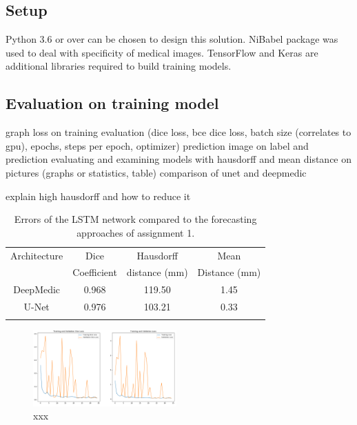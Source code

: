 
\subsection{Setup}

Python 3.6 or over can be chosen to design this solution. NiBabel package was used to deal with specificity of medical images. TensorFlow and Keras are additional libraries required to build training models. 

\subsection{Evaluation on training model}
graph loss on training evaluation (dice loss, bce dice loss, batch size (correlates to gpu), epochs, steps per epoch, optimizer)
prediction
image on label and prediction 
evaluating and examining models with hausdorff and mean distance on pictures (graphs or statistics, table)
comparison of unet and deepmedic

explain high hausdorff and how to reduce it

\begin{table}[h!]
	\centering
	\setlength{\tabcolsep}{10pt}
	\renewcommand{\arraystretch}{1.5}
	\begin{tabular}{c c c c}
		\hline 
		Architecture & Dice & Hausdorff & Mean \\
		& Coefficient & distance (mm) & Distance (mm) \\ 
		\hline 
		DeepMedic & 0.968 & 119.50 & 1.45 \\ 
		U-Net & 0.976 & 103.21 & 0.33 \\ 
		\hline
		\newline 
	\end{tabular}
	\caption{Errors of the LSTM network compared to the forecasting approaches of assignment 1.}
	\label{table_result}
\end{table}


\begin{figure}[h!]
	\includegraphics[width=0.49\textwidth, angle=0]{files/jpgunettrain.png}
	\caption{xxx}
	\label{scan_picture}
\end{figure}

